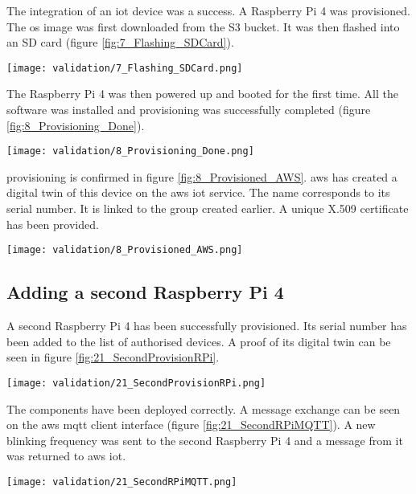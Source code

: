 The integration of an \acrshort{iot} device was a success. A Raspberry Pi 4 was provisioned. The \acrshort{os} image was first downloaded from the S3 bucket. It was then flashed into an SD card (figure \ref{fig:7_Flashing_SDCard}).
\begin{center}
    \begingroup
    \texttt{[image: validation/7\_Flashing\_SDCard.png]}
    \label{fig:7_Flashing_SDCard}
    \endgroup
\end{center}
The Raspberry Pi 4 was then powered up and booted for the first time. All the software was installed and \gls{provisioning} was successfully completed (figure \ref{fig:8_Provisioning_Done}).
\begin{center}
    \begingroup
    \texttt{[image: validation/8\_Provisioning\_Done.png]}
    \label{fig:8_Provisioning_Done}
    \endgroup
\end{center}
\Gls{provisioning} is confirmed in figure \ref{fig:8_Provisioned_AWS}. \gls{aws} has created a digital twin of this device on the \gls{aws} \acrshort{iot} service. The name corresponds to its serial number. It is linked to the group created earlier. A unique X.509 certificate has been provided.
\begin{center}
    \begingroup
    \texttt{[image: validation/8\_Provisioned\_AWS.png]}
    \label{fig:8_Provisioned_AWS}
    \endgroup
\end{center}

\subsection{Adding a second Raspberry Pi 4}
A second Raspberry Pi 4 has been successfully provisioned. Its serial number has been added to the list of authorised devices. A proof of its digital twin can be seen in figure \ref{fig:21_SecondProvisionRPi}.
\begin{center}
    \begingroup
    \texttt{[image: validation/21\_SecondProvisionRPi.png]}
    \label{fig:21_SecondProvisionRPi}
    \endgroup
\end{center}
The components have been deployed correctly. A message exchange can be seen on the \gls{aws} \acrshort{mqtt} client interface (figure \ref{fig:21_SecondRPiMQTT}). A new blinking frequency was sent to the second Raspberry Pi 4 and a message from it was returned to \gls{aws} \acrshort{iot}.
\begin{center}
    \begingroup
    \texttt{[image: validation/21\_SecondRPiMQTT.png]}
    \label{fig:21_SecondRPiMQTT}
    \endgroup
\end{center}

